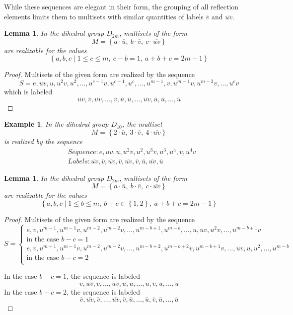 \documentclass[12pt]{article}
\newtheorem{lem}[thm]{Lemma}
\newtheorem{exa}[thm]{Example}
\newcommand{\ba}{\[\begin{aligned}}
\newcommand{\ea}{\end{aligned}\]}
\newcommand{\setof}[1]{\left\{#1\right\}}
\newcommand{\setdef}[2]{\left\{#1\mid#2\right\}}
\newcommand{\ol}[1]{\overline{#1}} %
\begin{document}
While these sequences are elegant in their form, the grouping of all reflection
elements limits them to multisets with similar quantities of labels $\ol{v}$ and $\ol{uv}$.

\begin{lem}\label{moreuv} In the dihedral group $D_{2m}$, multisets of the form
$$M = \setof{a \cdot \ol{u},\ b \cdot \ol{v},\ c \cdot \ol{uv}}$$
are realizable for the values
$$\setdef{a, b, c}{1 \leq c \leq m,\ c - b = 1,\ a + b + c = 2m - 1}$$
\end{lem}
\begin{proof}
  Multisets of the given form are realized by the sequence
  $$S = e, uv, u, u^2v, u^2, \dots, u^{c-1}v, u^{c-1}, u^{c}, \dots, u^{m-1}, v, u^{m-1}v, u^{m-2}v, \dots, u^{c}v$$
  which is labeled
  $$\ol{uv}, \ol{v}, \ol{uv}, \dots, \ol{v}, \ol{u}, \ol{u}, \dots, \ol{uv}, \ol{u}, \ol{u}, \dots, \ol{u}$$
\end{proof}
\begin{exa}
  In the dihedral group $D_{10}$, the multiset
  $$M = \setof{2 \cdot \ol{u},\ 3 \cdot \ol{v},\ 4 \cdot \ol{uv}}$$
  is realized by the sequence
  \ba
  &Sequence : e, uv, u, u^2v, u^2, u^3v, u^3, u^4, v, u^{4}v\\
  &Labels : \ol{uv}, \ol{v}, \ol{uv}, \ol{v}, \ol{uv}, \ol{v}, \ol{u}, \ol{uv}, \ol{u}
  \ea
\end{exa}

\begin{lem} \label{morev} In the dihedral group $D_{2m}$, multisets of the form
$$M = \setof{a \cdot \ol{u},\ b \cdot \ol{v},\ c \cdot \ol{uv}}$$
  are realizable for the values
  $$\setdef{a, b, c}{1 \leq b \leq m,\ b - c \in \setof{1, 2},\ a + b + c = 2m - 1}$$
\end{lem}
\begin{proof}
  Multisets of the given form are realized by the sequence
  $$
  S = \begin{cases}
    e, v, u^{m-1}, u^{m-1}v, u^{m-2}, u^{m-2}v, \dots, u^{m-b+1}, u^{m-b}, \dots, u, uv, u^2v, \dots, u^{m-b+1}v \\
    \text{in the case } b - c = 1\\
    e, v, u^{m-1}, u^{m-1}v, u^{m-2}, u^{m-2}v, \dots, u^{m-b+2}, u^{m-b+2}v, u^{m-b+1}v, \dots, uv, u, u^2, \dots, u^{m-b} \\
    \text{in the case } b - c = 2\\
  \end{cases}
  $$

  In the case $b - c = 1$, the sequence is labeled
  $$\ol{v}, \ol{uv}, \ol{v}, \dots, \ol{uv}, \ol{u}, \ol{u}, \dots, \ol{u}, \ol{v}, \ol{u}, \dots, \ol{u}$$
  In the case $b - c = 2$, the sequence is labeled
  $$\ol{v}, \ol{uv}, \ol{v}, \dots, \ol{uv}, \ol{v}, \ol{u}, \dots, \ol{u}, \ol{v}, \ol{u}, \dots, \ol{u}$$
\end{proof}
\end{document}
